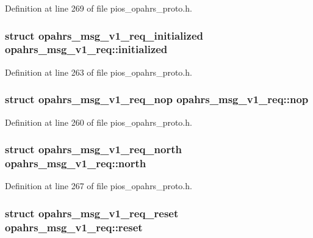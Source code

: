 Definition at line 269 of file pios\-\_\-opahrs\-\_\-proto.\-h.

\hypertarget{unionopahrs__msg__v1__req_a24e3c1cb6c682e83d40e878af812093d}{
\subsubsection[{initialized}]{\setlength{\rightskip}{0pt plus 5cm}struct {\bf opahrs\-\_\-msg\-\_\-v1\-\_\-req\-\_\-initialized} opahrs\-\_\-msg\-\_\-v1\-\_\-req\-::initialized}}\label{unionopahrs__msg__v1__req_a24e3c1cb6c682e83d40e878af812093d}


Definition at line 263 of file pios\-\_\-opahrs\-\_\-proto.\-h.

\hypertarget{unionopahrs__msg__v1__req_ad57def40cff11d2540a4d4684b333169}{
\subsubsection[{nop}]{\setlength{\rightskip}{0pt plus 5cm}struct {\bf opahrs\-\_\-msg\-\_\-v1\-\_\-req\-\_\-nop} opahrs\-\_\-msg\-\_\-v1\-\_\-req\-::nop}}\label{unionopahrs__msg__v1__req_ad57def40cff11d2540a4d4684b333169}


Definition at line 260 of file pios\-\_\-opahrs\-\_\-proto.\-h.

\hypertarget{unionopahrs__msg__v1__req_a24bfea89a8c0b6ce42af9d7c6a4d014c}{
\subsubsection[{north}]{\setlength{\rightskip}{0pt plus 5cm}struct {\bf opahrs\-\_\-msg\-\_\-v1\-\_\-req\-\_\-north} opahrs\-\_\-msg\-\_\-v1\-\_\-req\-::north}}\label{unionopahrs__msg__v1__req_a24bfea89a8c0b6ce42af9d7c6a4d014c}


Definition at line 267 of file pios\-\_\-opahrs\-\_\-proto.\-h.

\hypertarget{unionopahrs__msg__v1__req_a7dbb7f9888ecad27b75e70ec2149a18c}{
\subsubsection[{reset}]{\setlength{\rightskip}{0pt plus 5cm}struct {\bf opahrs\-\_\-msg\-\_\-v1\-\_\-req\-\_\-reset} opahrs\-\_\-msg\-\_\-v1\-\_\-req\-::reset}}\label{unionopahrs__msg__v1__req_a7dbb7f9888ecad27b75e70ec2149a18c}


